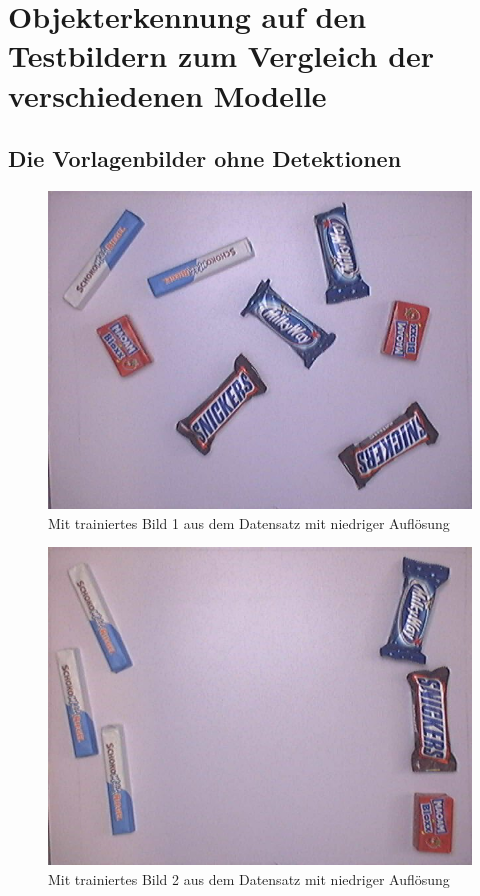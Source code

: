     
    \section{Objekterkennung auf den Testbildern zum Vergleich der verschiedenen Modelle}
    \label{app: Objekterkennung auf den Testbildern zum Vergleich der verschiedenen Modelle}
    
    \subsection{Die Vorlagenbilder ohne Detektionen}
    
    \begin{figure}[H]
        \vspace{-5mm}
        \centering
        \includegraphics[angle = 90, height = 0.85\textheight]{Bilder/models/model_comparison/images-to-detect/trained_1.jpg}
        \caption{Mit trainiertes Bild 1 aus dem Datensatz mit niedriger Auflösung}
    \end{figure}
    
    \begin{figure}[H]
        \centering
        \includegraphics[angle = 90, width = \textwidth]{Bilder/models/model_comparison/images-to-detect/trained_2.jpg}
        \caption{Mit trainiertes Bild 2 aus dem Datensatz mit niedriger Auflösung}
    \end{figure}
    
